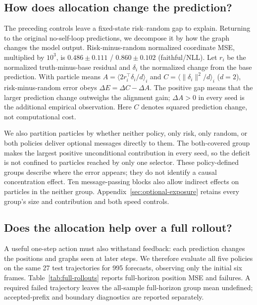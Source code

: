 \subsection{How does allocation change the prediction?}
The preceding controls leave a fixed-state risk--random gap to explain. Returning to the original no-self-loop predictions, we decompose it by how the graph changes the model output. Risk-minus-random normalized coordinate MSE, multiplied by $10^3$, is $0.486\pm0.111$ / $0.860\pm0.102$ (faithful/NLL). Let $r_i$ be the normalized truth-minus-base residual and $\delta_i$ the normalized change from the base prediction. With particle means $A=\langle2r_i^\top\delta_i/d\rangle_i$ and $C=\langle\|\delta_i\|^2/d\rangle_i$ ($d=2$), risk-minus-random error obeys $\Delta E=\Delta C-\Delta A$. The positive gap means that the larger prediction change outweighs the alignment gain; $\Delta A>0$ in every seed is the additional empirical observation. Here $C$ denotes squared prediction change, not computational cost.

We also partition particles by whether neither policy, only risk, only random, or both policies deliver optional messages directly to them. The both-covered group makes the largest positive unconditional contribution in every seed, so the deficit is not confined to particles reached by only one selector. These policy-defined groups describe where the error appears; they do not identify a causal concentration effect. Ten message-passing blocks also allow indirect effects on particles in the neither group. Appendix~\ref{sec:optional-exposure} retains every group's size and contribution and both speed controls.

\subsection{Does the allocation help over a full rollout?}
A useful one-step action must also withstand feedback: each prediction changes the positions and graphs seen at later steps. We therefore evaluate all five policies on the same 27 test trajectories for 995 forecasts, observing only the initial six frames. Table~\ref{tab:full-rollouts} reports full-horizon position MSE and failures. A required failed trajectory leaves the all-sample full-horizon group mean undefined; accepted-prefix and boundary diagnostics are reported separately.

